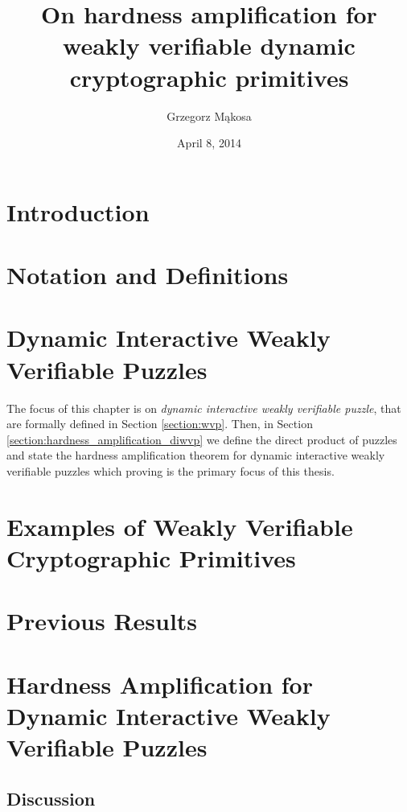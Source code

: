 \documentclass[11pt,a4paper,titlepage]{memoir}
\title{On hardness amplification for weakly verifiable dynamic cryptographic primitives}
\author{Grzegorz M\k{a}kosa}
\date{April 8, 2014}
\begin{document}
\frontmatter




\cleartorecto
\tableofcontents
\mainmatter

\chapter{Introduction}
\label{ch:introduction}

\chapter{Notation and Definitions}
\label{ch:preliminaries}

%
\chapter{Dynamic Interactive Weakly Verifiable Puzzles}
\label{ch:diwvp_main_thm}
The focus of this chapter is on \textit{dynamic interactive weakly verifiable puzzle}, that are formally defined in Section \ref{section:wvp}.
Then, in Section \ref{section:hardness_amplification_diwvp} we define the direct product of puzzles and state the hardness
amplification theorem for dynamic interactive weakly verifiable puzzles which proving is the primary focus of this thesis.
%

%
\chapter{Examples of Weakly Verifiable Cryptographic Primitives}
\label{ch:examples_wvcp}

%
\chapter{Previous Results}
\label{ch:previous_results}

%
\chapter{Hardness Amplification for Dynamic Interactive Weakly Verifiable Puzzles}
\label{ch:main_result}
%

%

%

%

%
\section{Discussion}
\label{ch:discussion}


\appendix


\backmatter



\end{document}
